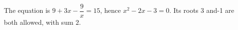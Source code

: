 The equation is $9+3x-\dfrac{9}{x}=15$, hence $x^2-2x-3=0$. Its roots 3 and-1 are both allowed, with sum $\boxed2$.
